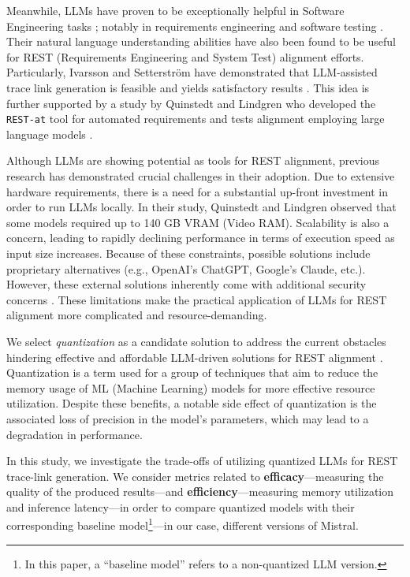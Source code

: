 \documentclass[conference]{IEEEtran}
\begin{document}
Meanwhile, LLMs have proven to be exceptionally helpful in Software Engineering tasks \cite{naveed2024Comprehensive}; notably in requirements engineering \cite{arora2024Advancing} and software testing \cite{dakhel2024Effective, wang2024Software}. Their natural language understanding abilities have also been found to be useful for REST (Requirements Engineering and System Test) alignment efforts. Particularly, Ivarsson and Setterström have demonstrated that LLM-assisted trace link generation is feasible and yields satisfactory results \cite{ivarsson2023automated}. This idea is further supported by a study by Quinstedt and Lindgren who developed the \verb|REST-at| tool for automated requirements and tests alignment employing large language models \cite{quinstedt2024Optimizing}.

Although LLMs are showing potential as tools for REST alignment, previous research has demonstrated crucial challenges in their adoption\cite{quinstedt2024Optimizing}. Due to extensive hardware requirements, there is a need for a substantial up-front investment in order to run LLMs locally. In their study, Quinstedt and Lindgren observed that some models required up to 140 GB VRAM (Video RAM). Scalability is also a concern, leading to rapidly declining performance in terms of execution speed as input size increases. Because of these constraints, possible solutions include proprietary alternatives (e.g., OpenAI's ChatGPT, Google's Claude, etc.). However, these external solutions inherently come with additional security concerns \cite{quinstedt2024Optimizing}. These limitations make the practical application of LLMs for REST alignment more complicated and resource-demanding.

We select \textit{quantization} as a candidate solution to address the current obstacles hindering effective and affordable LLM-driven solutions for REST alignment \cite{bai2024beyond}. Quantization is a term used for a group of techniques that aim to reduce the memory usage of ML (Machine Learning) models for more effective resource utilization. Despite these benefits, a notable side effect of quantization is the associated loss of precision in the model's parameters, which may lead to a degradation in performance.

In this study, we investigate the trade-offs of utilizing quantized LLMs for REST trace-link generation. We consider metrics related to \textbf{efficacy}---measuring the quality of the produced results---and \textbf{efficiency}---measuring memory utilization and inference latency---in order to compare quantized models with their corresponding baseline model\footnote{In this paper, a ``baseline model'' refers to a non-quantized LLM version.}---in our case, different versions of Mistral.
\end{document}

